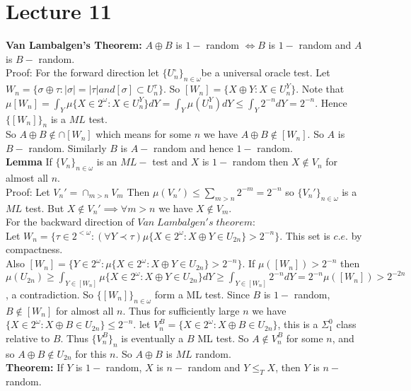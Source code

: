\documentclass{article}
\begin{document}
     \section{Lecture 11}
     \textbf{Van Lambalgen's Theorem:} $A \oplus B $ is $1-$ random $\iff B $ is $1-$ random and $A$ is $B-$ random.\\
     Proof: For the forward direction let $\{U_n^\square\}_{n\in \omega} $be a universal oracle test. Let $W_n = \{\sigma\oplus\tau : |\sigma| = | \tau| and [\sigma] \subset U_n^\tau\}$. So $[W_n] = \{X\oplus Y : X \in U_n^Y\}$. Note that $\mu[W_n] = \int_Y \mu\{X \in 2^\omega: X \in U_n^Y\} dY = \int_Y \mu(U_n^Y) dY \leq \int_Y 2^{-n}dY = 2^{-n}$. Hence $\{[W_n]\}_n$ is a $ML$ test. \\
     So $A \oplus B \not \in \cap [W_n]$ which means for some $n$ we have $A \oplus B \not \in [W_n]$. So $A$ is $B-$ random. Similarly $B$ is $A-$ random and hence $1-$ random.
     \\
     \textbf{Lemma} If $\{V_n\}_{n\in \omega}$ is an $ML-$ test and $X$ is $1-$ random then $X \not \in V_n$ for almost all $n$.\\
     Proof: Let $V_n' = \cap_{m>n} V_m$ Then $\mu(V_n') \leq \sum_{m>n} 2^{-m} = 2^{-n}$ so $\{V_n' \}_{n\in \omega}$ is a $ML$ test. But $X \not \in V_n' \implies \forall m> n $ we have $X \not \in V_m$.\\
     For the backward direction of $Van\; Lambalgen's \;theorem$:\\
      Let $W_n = \{\tau \in 2^{<\omega}: (\forall Y \prec \tau) \mu\{X\in 2^\omega: X \oplus Y \in U_{2n}\} > 2^{-n}\}$. This set is $c.e.$ by compactness. \\Also $[W_n] = \{ Y \in 2^\omega: \mu\{X \in 2^\omega: X \oplus Y \in U_{2n}\} > 2^{-n}\}$. If $\mu([W_n]) > 2^{-n}$ then $\mu(U_{2n}) \geq \int_{Y \in [W_n]} \mu\{X \in 2^\omega: X\oplus Y \in U_{2n}\}dY \geq \int_{Y \in [W_n]} 2^{-n} dY = 2^{-n} \mu([W_n]) > 2^{-2n} $, a contradiction. So $\{[W_n]\}_{n\in \omega}$  form a ML test. Since $B$ is $1-$ random, $B \not \in [W_n]$ for almost all $n$. Thus for sufficiently large $n$ we have $\{X \in 2^\omega: X\oplus B \in U_{2n}\} \leq 2^{-n}$. let $V_n^B = \{X \in 2^\omega: X\oplus B \in U_{2n}\}$, this is a $\Sigma^0_1 $ class relative to $B$. Thus $\{V_n^B\}_n$ is eventually a $B$ ML test. So $A \not \in V_n^B$ for some $n$, and so $A\oplus B \not \in U_{2n}$ for this $n$. So $A \oplus B$ is $ML$ random.\\
      \textbf{Theorem:} If $Y$ is $1-$ random, $X$ is $n-$ random and $Y\leq_T X$, then $Y$ is $n-$ random.
\end{document}
